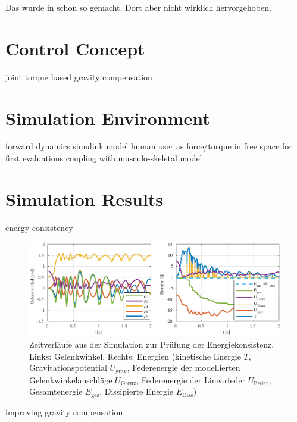 \documentclass[letterpaper, 10 pt, conference]{ieeeconf}  %
\begin{document}
%
Das wurde in \cite{WangGosselin1998} schon so gemacht. Dort aber nicht wirklich hervorgehoben.

\section{Control Concept}

joint torque based gravity compensation

\section{Simulation Environment}

forward dynamics
simulink model
human user as force/torque in free space for first evaluations
coupling with musculo-skeletal model \cite{KuehnHuSchHad2018}


\section{Simulation Results}

energy consistency

\begin{figure}[tb!]
    \includegraphics{figures/KAS5m5_Gelenkgrenzmodell_q_E.pdf} 
    \caption[Zeitverläufe aus der Simulation zur Prüfung der Energiekonsistenz]{Zeitverläufe aus der Simulation zur Prüfung der Energiekonsistenz. Links: Gelenkwinkel. Rechts: Energien (kinetische Energie $T$, Gravitationspotential $U_\mathrm{grav}$, Federenergie der modellierten Gelenkwinkelanschläge $U_\mathrm{Grenz}$, Federenergie der Linearfeder $U_\mathrm{Feder}$, Gesamtenergie $E_\mathrm{ges}$, Dissipierte Energie $E_\mathrm{Diss}$)}
    \label{fig:SimulationEnergiekonsistenz}
\end{figure} 


improving gravity compensation
\end{document}
